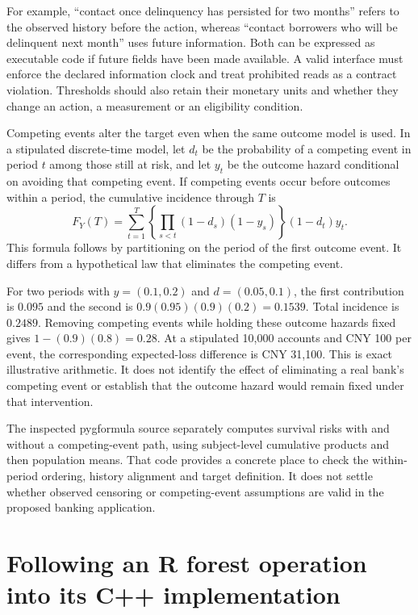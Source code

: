 For example, ``contact once delinquency has persisted for two months'' refers
to the observed history before the action, whereas ``contact borrowers who
will be delinquent next month'' uses future information. Both can be expressed
as executable code if future fields have been made available. A valid interface
must enforce the declared information clock and treat prohibited reads as a
contract violation. Thresholds should also retain their monetary units and
whether they change an action, a measurement or an eligibility condition.

Competing events alter the target even when the same outcome model is used.
In a stipulated discrete-time model, let $d_t$ be the probability of a competing
event in period $t$ among those still at risk, and let $y_t$ be the outcome
hazard conditional on avoiding that competing event. If competing events occur
before outcomes within a period, the cumulative incidence through $T$ is
\[
 F_Y(T)=\sum_{t=1}^T
 \left\{\prod_{s<t}(1-d_s)(1-y_s)\right\}(1-d_t)y_t.
\]
This formula follows by partitioning on the period of the first outcome event.
It differs from a hypothetical law that eliminates the competing event.

For two periods with $y=(0.1,0.2)$ and $d=(0.05,0.1)$, the first contribution
is $0.095$ and the second is $0.9(0.95)(0.9)(0.2)=0.1539$. Total incidence is
$0.2489$. Removing competing events while holding these outcome hazards fixed
gives $1-(0.9)(0.8)=0.28$. At a stipulated 10,000 accounts and CNY 100 per event,
the corresponding expected-loss difference is CNY 31,100. This is exact
illustrative arithmetic. It does not identify the effect of eliminating a
real bank's competing event or establish that the outcome hazard would remain
fixed under that intervention. \citep{v131_project_semantics}

The inspected pygformula source separately computes survival risks with and
without a competing-event path, using subject-level cumulative products and
then population means. That code provides a concrete place to check the
within-period ordering, history alignment and target definition. It does not
settle whether observed censoring or competing-event assumptions are valid in
the proposed banking application. \citep{v131_sw_pygformula}

\section{Following an R forest operation into its C++ implementation}

